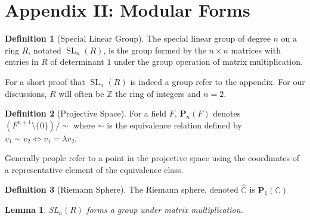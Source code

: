 \documentclass{article}
\newtheorem{lemma}[theorem]{Lemma}
\theoremstyle{definition}
\newtheorem{definition}{Definition}[section]
\theoremstyle{definition}
\theoremstyle{definition}
\newcommand{\SL}{\operatorname{SL}}
\begin{document}


 







\section{Appendix II: Modular Forms}

\begin{definition} [Special Linear Group]
The special linear group of degree $n$ on a ring $R$, notated $\SL_n(R)$, is the group formed by the $n\times n$ matrices with entries in $R$ of determinant $1$ under the group operation of matrix multiplication.
\end{definition}

For a short proof that $\SL_n(R)$ is indeed a group refer to the appendix. For our discussions, $R$ will often be $\mathbb{Z}$ the ring of integers and $n=2$.

\begin{definition} [Projective Space]
    For a field $F$, $\boldsymbol{P}_n(F)$ denotes $(F^{n+1}\setminus\{0\})/\sim$ where $\sim$ is the equivalence relation defined by $v_1\sim v_2\iff v_1=\lambda v_2$.
\end{definition}
Generally people refer to a point in the projective space using the coordinates of a representative element of the equivalence class. 

\begin{definition} [Riemann Sphere]
The Riemann sphere, denoted $\hat{\mathbb{C}}$ is $\boldsymbol{P}_1(\mathbb{C})$
\end{definition}

\begin{lemma}
SL$_n(R)$ forms a group under matrix multiplication.
\end{lemma}
\end{document}
